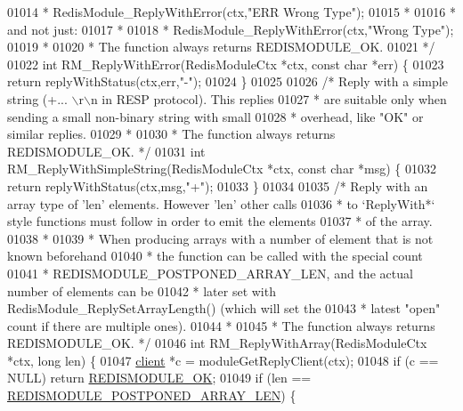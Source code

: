 \begin{DoxyCode}
{{01014 \textcolor{comment}{ *     RedisModule\_ReplyWithError(ctx,"ERR Wrong Type");}
01015 \textcolor{comment}{ *}
01016 \textcolor{comment}{ * and not just:}
01017 \textcolor{comment}{ *}
01018 \textcolor{comment}{ *     RedisModule\_ReplyWithError(ctx,"Wrong Type");}
01019 \textcolor{comment}{ *}
01020 \textcolor{comment}{ * The function always returns REDISMODULE\_OK.}
01021 \textcolor{comment}{ */}
01022 \textcolor{keywordtype}{int} RM\_ReplyWithError(RedisModuleCtx *ctx, \textcolor{keyword}{const} \textcolor{keywordtype}{char} *err) \{
01023     \textcolor{keywordflow}{return} replyWithStatus(ctx,err,\textcolor{stringliteral}{"-"});
01024 \}
01025 
01026 \textcolor{comment}{/* Reply with a simple string (+... \(\backslash\)r\(\backslash\)n in RESP protocol). This replies}
01027 \textcolor{comment}{ * are suitable only when sending a small non-binary string with small}
01028 \textcolor{comment}{ * overhead, like "OK" or similar replies.}
01029 \textcolor{comment}{ *}
01030 \textcolor{comment}{ * The function always returns REDISMODULE\_OK. */}
01031 \textcolor{keywordtype}{int} RM\_ReplyWithSimpleString(RedisModuleCtx *ctx, \textcolor{keyword}{const} \textcolor{keywordtype}{char} *msg) \{
01032     \textcolor{keywordflow}{return} replyWithStatus(ctx,msg,\textcolor{stringliteral}{"+"});
01033 \}
01034 
01035 \textcolor{comment}{/* Reply with an array type of 'len' elements. However 'len' other calls}
01036 \textcolor{comment}{ * to `ReplyWith*` style functions must follow in order to emit the elements}
01037 \textcolor{comment}{ * of the array.}
01038 \textcolor{comment}{ *}
01039 \textcolor{comment}{ * When producing arrays with a number of element that is not known beforehand}
01040 \textcolor{comment}{ * the function can be called with the special count}
01041 \textcolor{comment}{ * REDISMODULE\_POSTPONED\_ARRAY\_LEN, and the actual number of elements can be}
01042 \textcolor{comment}{ * later set with RedisModule\_ReplySetArrayLength() (which will set the}
01043 \textcolor{comment}{ * latest "open" count if there are multiple ones).}
01044 \textcolor{comment}{ *}
01045 \textcolor{comment}{ * The function always returns REDISMODULE\_OK. */}
01046 \textcolor{keywordtype}{int} RM\_ReplyWithArray(RedisModuleCtx *ctx, \textcolor{keywordtype}{long} len) \{
01047     \hyperlink{structclient}{client} *c = moduleGetReplyClient(ctx);
01048     \textcolor{keywordflow}{if} (c == NULL) \textcolor{keywordflow}{return} \hyperlink{redismodule_8h_a1bc5bfd69abcd378ff52c640adc5418d}{REDISMODULE\_OK};
01049     \textcolor{keywordflow}{if} (len == \hyperlink{redismodule_8h_af07005134cbf107aad1c8e0ded8fcf2b}{REDISMODULE\_POSTPONED\_ARRAY\_LEN}) \{
}}
\end{DoxyCode}
